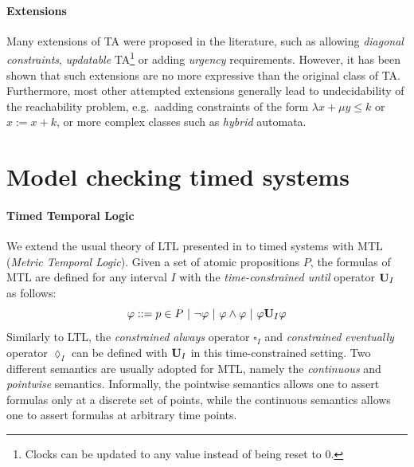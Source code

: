 \documentclass[11pt]{article}
\theoremstyle{definition}
\theoremstyle{remark}
\theoremstyle{definition}
\begin{document}




\paragraph{Extensions}\label{par:ta_ext}
Many extensions of TA were proposed in the literature, such as allowing \emph{diagonal constraints}, \emph{updatable} TA\footnote{Clocks can be updated to any value instead of being reset to 0.} or adding \emph{urgency} requirements. However, it has been shown that such extensions are no more expressive than the original class of TA. Furthermore, most other attempted extensions generally lead to undecidability of the reachability problem, e.g.\ aadding constraints of the form $\lambda x + \mu y \leq k$ or $x := x + k$, or more complex classes such as \emph{hybrid} automata.

\section{Model checking timed systems}\label{sec:app}
\paragraph{Timed Temporal Logic}\label{par:timedlogic} We extend the usual theory of LTL presented in \cite[Chapter~2]{handbook} to timed systems with MTL (\emph{Metric Temporal Logic}).
Given a set of atomic propositions $P$, the formulas of MTL are defined for any interval $I$ with the \emph{time-constrained until} operator $\text{\bf U}_I$ as follows:
\begin{equation*}
	\varphi ::= p \in P\ |\ \neg \varphi\ |\ \varphi \land \varphi\ |\ \varphi \text{\bf U}_I \varphi
\end{equation*}
Similarly to LTL, the \emph{constrained always} operator $\square_I$ and \emph{constrained eventually} operator $\lozenge_I$ can be defined with $\text{\bf U}_I$ in this time-constrained setting. Two different semantics are usually adopted for MTL, namely the \emph{continuous} and \emph{pointwise} semantics. Informally, the pointwise semantics allows one to assert formulas only at a discrete set of points, while the continuous semantics allows one to assert formulas at arbitrary time points.
\end{document}
